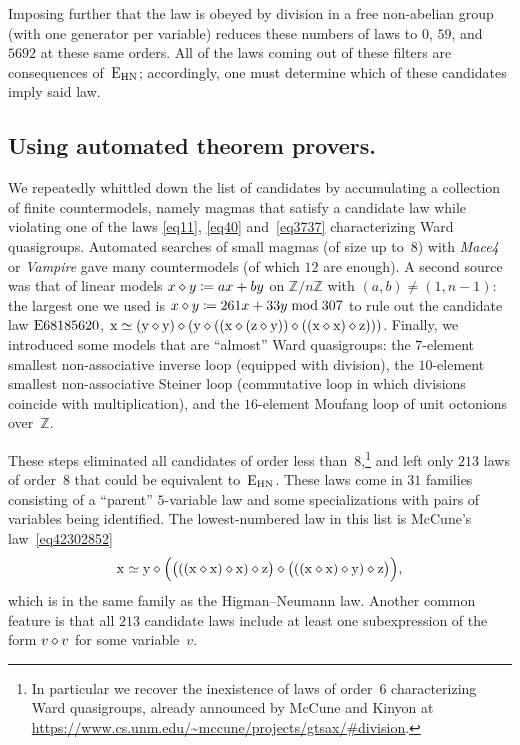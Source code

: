 Imposing further that the law is obeyed by division in a free non-abelian group (with one generator per variable) reduces these numbers of laws to $0$, $59$, and $\num{5692}$ at these same orders.  All of the laws coming out of these filters are consequences of~$\mathrm{E}_{\mathrm{HN}}$; accordingly, one must determine which of these candidates imply said law.

\subsection{Using automated theorem provers.}

We repeatedly whittled down the list of candidates by accumulating a collection of finite countermodels, namely magmas that satisfy a candidate law while violating one of the laws \eqref{eq11}, \eqref{eq40} and~\eqref{eq3737} characterizing Ward quasigroups.  Automated searches of small magmas (of size up to~$8$) with \emph{Mace4} or \emph{Vampire} gave many countermodels (of which $12$ are enough).  A second source was that of linear models $x \diamond y \coloneqq ax+by$ on $\mathbb{Z}/n\mathbb{Z}$ with $(a,b)\neq(1,n-1)$: the largest one we used is $x \diamond y \coloneqq 261x + 33y \bmod 307$ to rule out the candidate law $\mathrm{E}68185620$, $\mathrm{x} \simeq (\mathrm{y} \diamond \mathrm{y}) \diamond (\mathrm{y} \diamond ((\mathrm{x} \diamond (\mathrm{z} \diamond \mathrm{y})) \diamond ((\mathrm{x} \diamond \mathrm{x}) \diamond \mathrm{z})))$.  Finally, we introduced some models that are ``almost'' Ward quasigroups: the $7$-element smallest non-associative inverse loop (equipped with division), the $10$-element smallest non-associative Steiner loop (commutative loop in which divisions coincide with multiplication), and the $16$-element Moufang loop of unit octonions over~$\mathbb{Z}$.

These steps eliminated all candidates of order less than~$8$,\footnote{In particular we recover the inexistence of laws of order~$6$ characterizing Ward quasigroups, already announced by McCune and Kinyon at \url{https://www.cs.unm.edu/~mccune/projects/gtsax/\#division}.} and left only $213$ laws of order~$8$ that could be equivalent to~$\mathrm{E}_{\mathrm{HN}}$.  These laws come in $31$ families consisting of a ``parent'' $5$-variable law and some specializations with pairs of variables being identified.  The lowest-numbered law in this list is McCune's law~\eqref{eq42302852}
\[
\mathrm{x} \simeq \mathrm{y} \diamond \Bigl(\bigl(((\mathrm{x} \diamond \mathrm{x}) \diamond \mathrm{x}) \diamond \mathrm{z}\bigr) \diamond \bigl(((\mathrm{x} \diamond \mathrm{x}) \diamond \mathrm{y}) \diamond \mathrm{z}\bigr)\Bigr) ,
\]
which is in the same family as the Higman--Neumann law.  Another common feature is that all $213$ candidate laws include at least one subexpression of the form $v \diamond v$ for some variable~$v$.

